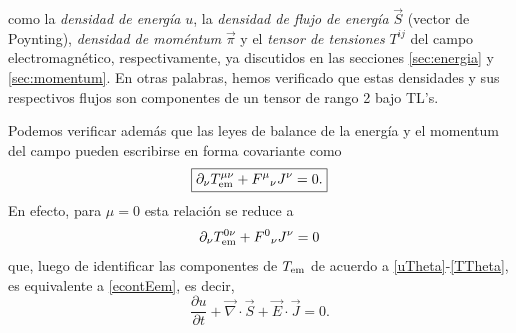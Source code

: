 como la \textit{densidad de energía} $u$, la \textit{densidad de flujo de
energía} $\vec{S}$ (vector de Poynting), \textit{densidad de moméntum}
$\vec{\pi}$ y el \textit{tensor de tensiones} $T^{ij}$ del campo
electromagnético, respectivamente, ya discutidos en las secciones \ref{sec:energia} y \ref{sec:momentum}. En otras palabras, hemos verificado que estas densidades y sus respectivos flujos son componentes de un tensor de rango 2 bajo TL's.


Podemos verificar además que las leyes de balance de la energía y el momentum del campo pueden escribirse en forma covariante como
\begin{equation}
\boxed{\partial_\nu T_{\rm em}^{\mu\nu}+ F^\mu{}_\nu J^\nu=0.}
\label{clem}
\end{equation}
En efecto, para $\mu=0$ esta relación se reduce a
\begin{equation}
\partial_\nu T_{\rm em}^{0\nu}+F^0{}_\nu J^\nu=0
\end{equation}
que, luego de identificar las componentes de $T_{\rm em}$ de acuerdo a \eqref{uTheta}-\eqref{TTheta}, es equivalente a \eqref{econtEem}, es decir,
\begin{equation}
\frac{\partial u}{\partial
t}+\vec{\nabla}\cdot\vec{S}+\vec{E}\cdot\vec{J}  =0.
\end{equation}

